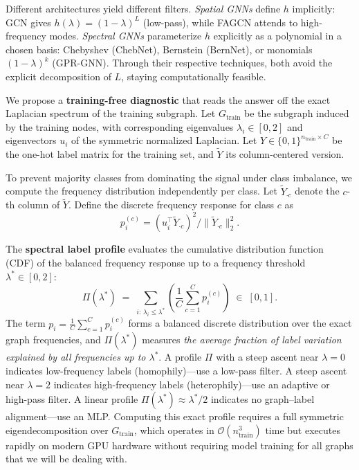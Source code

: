 \documentclass[11pt]{article}
\begin{document}
Different architectures yield different filters. \emph{Spatial GNNs}
define $h$ implicitly: GCN gives $h(\lambda) = (1-\lambda)^L$ (low-pass),
while FAGCN \citep{bo2021fagcn} attends to high-frequency modes.
\emph{Spectral GNNs} parameterize $h$ explicitly as a polynomial in a
chosen basis: Chebyshev (ChebNet), Bernstein (BernNet), or monomials
$(1-\lambda)^k$ (GPR-GNN). Through their respective techniques, both avoid the explicit decomposition of $L$, staying computationally feasible.

We propose a \textbf{training-free diagnostic} that reads the answer off the exact Laplacian spectrum of the training subgraph. Let $G_{\text{train}}$ be the subgraph induced by the training nodes, with corresponding eigenvalues $\lambda_i \in [0, 2]$ and eigenvectors $u_i$ of the symmetric normalized Laplacian. Let $Y \in \{0,1\}^{n_{\text{train}} \times C}$ be the one-hot label matrix for the training set, and $\tilde{Y}$ its column-centered version. 

To prevent majority classes from dominating the signal under class imbalance, we compute the frequency distribution independently per class. Let $\tilde{Y}_{\cdot c}$ denote the $c$-th column of $\tilde{Y}$. Define the discrete frequency response for class $c$ as \begin{equation}p_i^{(c)} = (u_i^\top \tilde{Y}_{\cdot c})^2 / \lVert \tilde{Y}_{\cdot c} \rVert_2^2.\label{eq:p_i}\end{equation}

The \textbf{spectral label profile} evaluates the cumulative distribution function (CDF) of the balanced frequency response up to a frequency threshold $\lambda^* \in [0,2]$:
\begin{equation}
  \Pi(\lambda^*) \;=\; \sum_{i:\, \lambda_i \leq \lambda^*} \left( \frac{1}{C} \sum_{c=1}^C p_i^{(c)} \right) \;\in\; [0,1].
  \label{eq:pi_lambda}
\end{equation}
The term $p_i = \frac{1}{C} \sum_{c=1}^C p_i^{(c)}$ forms a balanced discrete distribution over the exact graph frequencies, and $\Pi(\lambda^*)$ measures \emph{the average fraction of label variation explained by all frequencies up to $\lambda^*$}. A profile $\Pi$ with a steep ascent near $\lambda=0$ indicates low-frequency labels (homophily)---use a low-pass filter. A steep ascent near $\lambda=2$ indicates high-frequency labels (heterophily)---use an adaptive or high-pass filter. A linear profile $\Pi(\lambda^*) \approx \lambda^*/2$ indicates no graph--label alignment---use an MLP. Computing this exact profile requires a full symmetric eigendecomposition over $G_{\text{train}}$, which operates in $\mathcal{O}(n_{\text{train}}^3)$ time but executes rapidly on modern GPU hardware without requiring model training for all graphs that we will be dealing with.
\end{document}
